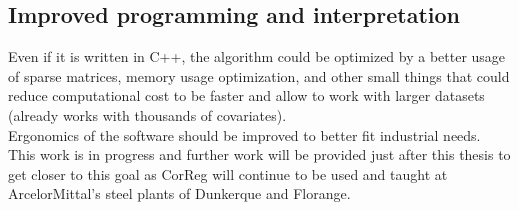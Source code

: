 \documentclass[12pt,a4paper]{report}
\begin{document}
		\subsection{Improved programming and interpretation}
			Even if it is written in C++, the algorithm could be optimized by a better usage of sparse matrices, memory usage optimization, and other small things that could reduce computational cost to be faster and allow to work with larger datasets (already works with thousands of covariates).\\
			Ergonomics of the software should be improved to better fit industrial needs. This work is in progress and further work will be provided just after this thesis to get closer to this goal as {\sc CorReg} will continue to be used and taught at ArcelorMittal's steel plants of Dunkerque and Florange.
			
		
\cleardoublepage


%

%		
%		
%		
%		
%		
%			
\end{document}
